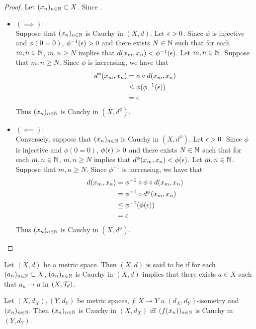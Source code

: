 \documentclass{book}
\begin{document}
\begin{proof}
	Let $(x_n)_{n \in \mathbb{N}} \subset X$. Since . 
	\begin{itemize}
		\item $(\implies):$ \\
		Suppose that $(x_n)_{n \in \mathbb{N}}$ is Cauchy in $(X, d)$. Let $\epsilon >0$. Since $\phi$ is injective and $\phi(0 = 0)$, $\phi^{-1}(\epsilon) > 0$ and there exists $N \in \mathbb{N}$ such that for each $m,n \in \mathbb{N}$, $m,n \geq N$ implies that $d(x_m, x_n) < \phi^{-1}(\epsilon)$. Let $m,n \in \mathbb{N}$. Suppose that $m,n \geq N$. Since $\phi$ is increasing, we have that 
		\begin{align*}
			d^{\phi}(x_m, x_n)
			& = \phi \circ d(x_m, x_n) \\
			& \leq \phi(\phi^{-1}(\epsilon)) \\
			& = \epsilon 
		\end{align*}
		Thus $(x_n)_{n \in \mathbb{N}}$ is Cauchy in $(X, d^{\phi})$.  
		\item $(\impliedby):$ \\
		Conversely, suppose that $(x_n)_{n \in \mathbb{N}}$ is Cauchy in $(X, d^{\phi})$. Let $\epsilon >0$. Since $\phi$ is injective and $\phi(0 = 0)$, $\phi(\epsilon) > 0$ and there exists $N \in \mathbb{N}$ such that for each $m,n \in \mathbb{N}$, $m,n \geq N$ implies that $d^{\phi}(x_m, x_n) < \phi(\epsilon)$. Let $m,n \in \mathbb{N}$. Suppose that $m,n \geq N$. Since $\phi^{-1}$ is increasing, we have that 
		\begin{align*}
			d(x_m, x_n)
			& = \phi^{-1} \circ \phi \circ d(x_m, x_n) \\
			& = \phi^{-1} \circ d^{\phi}(x_m, x_n) \\
			& \leq \phi^{-1}(\phi(\epsilon)) \\
			& = \epsilon 
		\end{align*}
		Thus $(x_n)_{n \in \mathbb{N}}$ is Cauchy in $(X, d^{\phi})$.  
	\end{itemize}
\end{proof}

\begin{defn} 
	Let $(X, d)$ be a metric space. Then $(X, d)$ is said to be  if for each $(a_n)_{n \in \mathbb{N}} \subset X$, $(a_n)_{n \in \mathbb{N}}$ is Cauchy in $(X,d)$ implies that there exists $a \in X$ such that $a_n \rightarrow a$ in $(X, \mathcal{T}_d)$.
\end{defn}

\begin{ex} 
	Let $(X, d_X), (Y, d_Y)$ be metric spaces, $f:X \rightarrow Y$ a $(d_X, d_Y)$-isometry and $(x_n)_{n \in \mathbb{N}}$. Then $(x_n)_{n \in \mathbb{N}}$ is Cauchy in $(X, d_X)$ iff $(f(x_n))_{n \in \mathbb{N}}$ is Cauchy in $(Y, d_Y)$. 
\end{ex}
\end{document}
